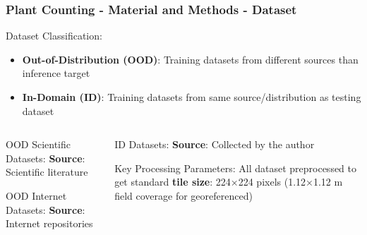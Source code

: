 \documentclass[aspectratio=43]{beamer}
\begin{document}
\begin{frame}
    \frametitle{Plant Counting - Material and Methods - Dataset}
    
    \begin{block}{Dataset Classification:}
        \small
        \begin{itemize}
            \item \textbf{Out-of-Distribution (OOD)}: Training datasets from different sources than inference target
            \item \textbf{In-Domain (ID)}: Training datasets from same source/distribution as testing dataset
        \end{itemize}
    \end{block}
    
    \begin{columns}
        \begin{column}{0.5\textwidth}
            \begin{block}{OOD Scientific Datasets:}
                    \textbf{Source}: Scientific literature
            \end{block}
            
            \begin{block}{OOD Internet Datasets:}
                \textbf{Source}: Internet repositories
            \end{block}
        \end{column}
        
        \begin{column}{0.5\textwidth}
            \begin{block}{ID Datasets:}
                \textbf{Source}: Collected by the author
            \end{block}
            
            \begin{exampleblock}{Key Processing Parameters:}
                \scriptsize
                    All dataset preprocessed to get standard \textbf{tile size}: 224×224 pixels (1.12×1.12 m field coverage for georeferenced)
            \end{exampleblock}
        \end{column}
    \end{columns}
\end{frame}
\end{document}
